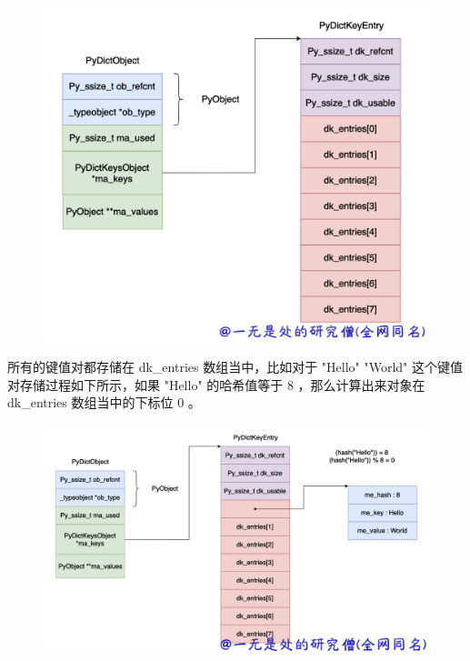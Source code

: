     \begin{figure}[H]
        \centering
            \includegraphics[scale=.25]{images/31-bytes.png}
						\caption{ }
        \label{fig:my_label}
    \end{figure}
    
所有的键值对都存储在 dk\_entries 数组当中，比如对于 "Hello" "World" 这个键值对存储过程如下所示，如果 "Hello" 的哈希值等于 8 ，那么计算出来对象在 dk\_entries 数组当中的下标位 0 。

    \begin{figure}[H]
        \centering
            \includegraphics[scale=.25]{images/32-dict.png}
						\caption{ }
        \label{fig:my_label}
    \end{figure}
    
